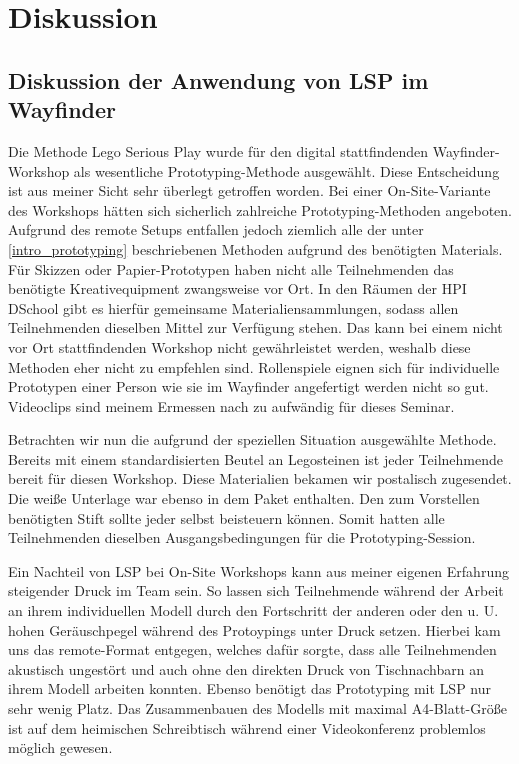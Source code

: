 \section{Diskussion}
\label{diskussion}

\subsection{Diskussion der Anwendung von LSP im Wayfinder}
Die Methode Lego Serious Play wurde für den digital stattfindenden Wayfinder-Workshop als wesentliche Prototyping-Methode ausgewählt. Diese Entscheidung ist aus meiner Sicht sehr überlegt getroffen worden.
Bei einer On-Site-Variante des Workshops hätten sich sicherlich zahlreiche Prototyping-Methoden angeboten. Aufgrund des remote Setups entfallen jedoch ziemlich alle der unter \ref{intro_prototyping} beschriebenen Methoden aufgrund des benötigten Materials. Für Skizzen oder Papier-Prototypen haben nicht alle Teilnehmenden das benötigte Kreativequipment zwangsweise vor Ort. In den Räumen der HPI DSchool gibt es hierfür gemeinsame Materialiensammlungen, sodass allen Teilnehmenden dieselben Mittel zur Verfügung stehen. Das kann bei einem nicht vor Ort stattfindenden Workshop nicht gewährleistet werden, weshalb diese Methoden eher nicht zu empfehlen sind. Rollenspiele eignen sich für individuelle Prototypen einer Person wie sie im Wayfinder angefertigt werden nicht so gut. Videoclips sind meinem Ermessen nach zu aufwändig für dieses Seminar.

Betrachten wir nun die aufgrund der speziellen Situation ausgewählte Methode. Bereits mit einem standardisierten Beutel an Legosteinen ist jeder Teilnehmende bereit für diesen Workshop. Diese Materialien bekamen wir postalisch zugesendet. Die weiße Unterlage war ebenso in dem Paket enthalten. Den zum Vorstellen benötigten Stift sollte jeder selbst beisteuern können. Somit hatten alle Teilnehmenden dieselben Ausgangsbedingungen für die Prototyping-Session.

Ein Nachteil von LSP bei On-Site Workshops kann aus meiner eigenen Erfahrung steigender Druck im Team sein. So lassen sich Teilnehmende während der Arbeit an ihrem individuellen Modell durch den Fortschritt der anderen oder den u. U. hohen Geräuschpegel während des Protoypings unter Druck setzen. Hierbei kam uns das remote-Format entgegen, welches dafür sorgte, dass alle Teilnehmenden akustisch ungestört und auch ohne den direkten Druck von Tischnachbarn an ihrem Modell arbeiten konnten.
Ebenso benötigt das Prototyping mit LSP nur sehr wenig Platz. Das Zusammenbauen des Modells mit maximal A4-Blatt-Größe ist auf dem heimischen Schreibtisch während einer Videokonferenz problemlos möglich gewesen. 

